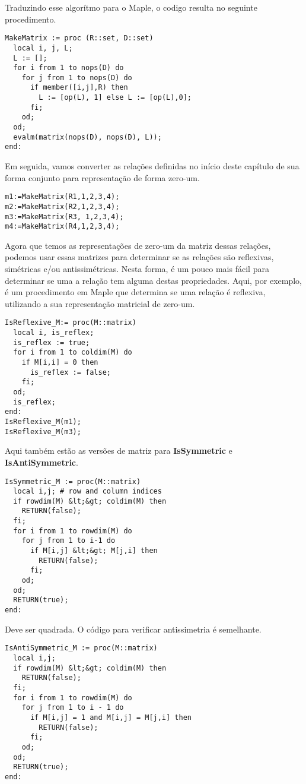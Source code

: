 \documentclass[a4paper]{article}
\begin{document}
Traduzindo esse algorítmo para o Maple, o codigo resulta no seguinte procedimento.

\begin{lstlisting}
MakeMatrix := proc (R::set, D::set)
  local i, j, L;
  L := [];
  for i from 1 to nops(D) do
    for j from 1 to nops(D) do
      if member([i,j],R) then
        L := [op(L), 1] else L := [op(L),0];
      fi;
    od;
  od;
  evalm(matrix(nops(D), nops(D), L));
end:
\end{lstlisting}

Em seguida, vamos converter as relações definidas no início deste capítulo de sua forma conjunto para representação de forma zero-um.

\begin{lstlisting}
m1:=MakeMatrix(R1,1,2,3,4);
m2:=MakeMatrix(R2,1,2,3,4);
m3:=MakeMatrix(R3, 1,2,3,4);
m4:=MakeMatrix(R4,1,2,3,4);
\end{lstlisting}

Agora que temos as representações de zero-um da matriz dessas relações, podemos usar essas matrizes para determinar se as relações são reflexivas, simétricas e/ou antissimétricas. Nesta forma, é um pouco mais fácil para determinar se uma a relação tem alguma destas propriedades. Aqui, por exemplo, é um procedimento em Maple que determina se uma relação é reflexiva, utilizando a sua representação matricial de zero-um.

\begin{lstlisting}
IsReflexive_M:= proc(M::matrix)
  local i, is_reflex;
  is_reflex := true;
  for i from 1 to coldim(M) do
    if M[i,i] = 0 then
      is_reflex := false;
    fi;
  od;
  is_reflex;
end:
IsReflexive_M(m1);
IsReflexive_M(m3);
\end{lstlisting}

Aqui também estão as versões de matriz para \textbf{IsSymmetric} e \textbf{IsAntiSymmetric}.

\begin{lstlisting}
IsSymmetric_M := proc(M::matrix)
  local i,j; # row and column indices
  if rowdim(M) &lt;&gt; coldim(M) then
    RETURN(false);
  fi;
  for i from 1 to rowdim(M) do
    for j from 1 to i-1 do
      if M[i,j] &lt;&gt; M[j,i] then
        RETURN(false);
      fi;
    od;
  od;
  RETURN(true);
end:
\end{lstlisting}

Deve ser quadrada.
O código para verificar antissimetria é semelhante.

\begin{lstlisting}
IsAntiSymmetric_M := proc(M::matrix)
  local i,j;
  if rowdim(M) &lt;&gt; coldim(M) then
    RETURN(false);
  fi;
  for i from 1 to rowdim(M) do
    for j from 1 to i - 1 do
      if M[i,j] = 1 and M[i,j] = M[j,i] then
        RETURN(false);
      fi;
    od;
  od;
  RETURN(true);
end:
\end{lstlisting}
\end{document}
